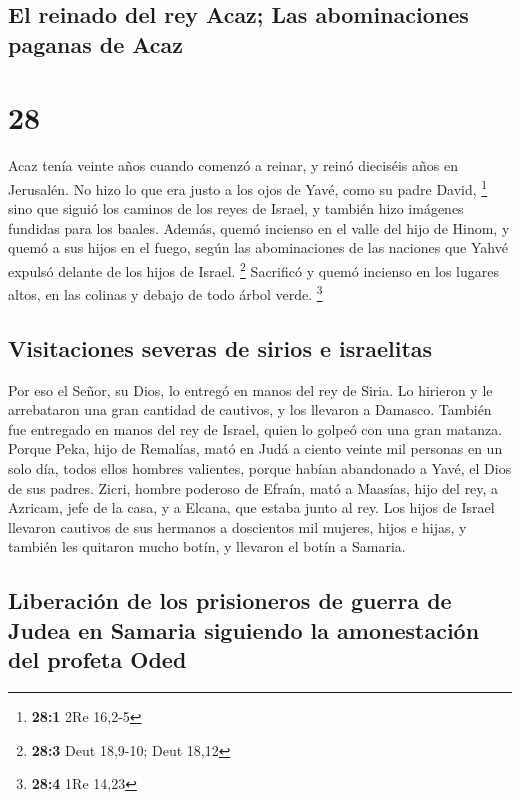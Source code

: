 \hypertarget{el-reinado-del-rey-acaz-las-abominaciones-paganas-de-acaz}{%
\subsection{El reinado del rey Acaz; Las abominaciones paganas de
Acaz}\label{el-reinado-del-rey-acaz-las-abominaciones-paganas-de-acaz}}

\hypertarget{section-27}{%
\section{28}\label{section-27}}

 Acaz tenía veinte años cuando comenzó a reinar, y reinó
dieciséis años en Jerusalén. No hizo lo que era justo a los ojos de
Yavé, como su padre David, \footnote{\textbf{28:1} 2Re 16,2-5}
 sino que siguió los caminos de los reyes de Israel, y
también hizo imágenes fundidas para los baales.  Además,
quemó incienso en el valle del hijo de Hinom, y quemó a sus hijos en el
fuego, según las abominaciones de las naciones que Yahvé expulsó delante
de los hijos de Israel. \footnote{\textbf{28:3} Deut 18,9-10; Deut 18,12}
 Sacrificó y quemó incienso en los lugares altos, en las
colinas y debajo de todo árbol verde. \footnote{\textbf{28:4} 1Re 14,23}

\hypertarget{visitaciones-severas-de-sirios-e-israelitas}{%
\subsection{Visitaciones severas de sirios e
israelitas}\label{visitaciones-severas-de-sirios-e-israelitas}}

 Por eso el Señor, su Dios, lo entregó en manos del rey de
Siria. Lo hirieron y le arrebataron una gran cantidad de cautivos, y los
llevaron a Damasco. También fue entregado en manos del rey de Israel,
quien lo golpeó con una gran matanza.  Porque Peka, hijo
de Remalías, mató en Judá a ciento veinte mil personas en un solo día,
todos ellos hombres valientes, porque habían abandonado a Yavé, el Dios
de sus padres.  Zicri, hombre poderoso de Efraín, mató a
Maasías, hijo del rey, a Azricam, jefe de la casa, y a Elcana, que
estaba junto al rey.  Los hijos de Israel llevaron
cautivos de sus hermanos a doscientos mil mujeres, hijos e hijas, y
también les quitaron mucho botín, y llevaron el botín a Samaria.

\hypertarget{liberaciuxf3n-de-los-prisioneros-de-guerra-de-judea-en-samaria-siguiendo-la-amonestaciuxf3n-del-profeta-oded}{%
\subsection{Liberación de los prisioneros de guerra de Judea en Samaria
siguiendo la amonestación del profeta
Oded}\label{liberaciuxf3n-de-los-prisioneros-de-guerra-de-judea-en-samaria-siguiendo-la-amonestaciuxf3n-del-profeta-oded}}

